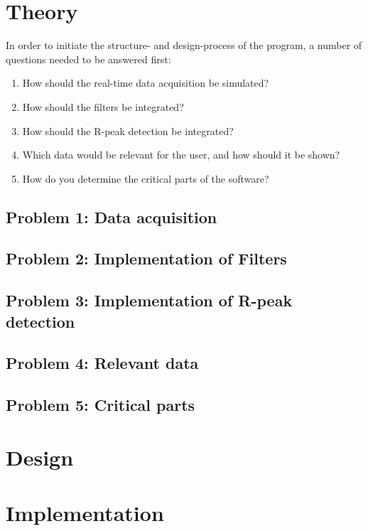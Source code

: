 \documentclass[12pt,a4paper]{article}
\begin{document}
\section{Theory}
 	In order to initiate the structure- and design-process of the program, a number of questions needed to be answered first:\\
 	
 	\begin{enumerate}
	\item How should the real-time data acquisition be simulated?
	\item How should the filters be integrated?
	\item How should the R-peak detection be integrated?
	\item Which data would be relevant for the user, and how should it be shown?
	\item How do you determine the critical parts of the software?
\end{enumerate}

\subsection{Problem 1: Data acquisition}
	
\subsection{Problem 2: Implementation of Filters}
	
\subsection{Problem 3: Implementation of R-peak detection}

\subsection{Problem 4: Relevant data}

\subsection{Problem 5: Critical parts}

\section{Design}

\section{Implementation}
\end{document}
